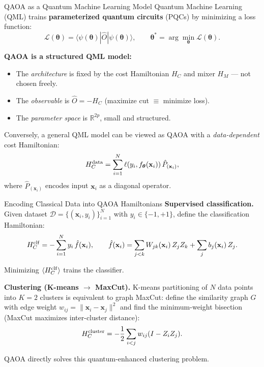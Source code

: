\documentclass{beamer}
\begin{document}
\begin{frame}{QAOA as a Quantum Machine Learning Model}
Quantum Machine Learning (QML) trains \textbf{parameterized quantum
circuits} (PQCs) by minimizing a loss function:
\[
\mathcal{L}(\boldsymbol{\theta})
= \langle\psi(\boldsymbol{\theta})|\hat{O}|\psi(\boldsymbol{\theta})\rangle,
\qquad
\boldsymbol{\theta}^* = \arg\min_{\boldsymbol{\theta}}\mathcal{L}(\boldsymbol{\theta}).
\]

\textbf{QAOA is a structured QML model:}
\begin{itemize}
\item The \emph{architecture} is fixed by the cost Hamiltonian $H_C$
  and mixer $H_M$ — not chosen freely.
\item The \emph{observable} is $\hat{O} = -H_C$ (maximize cut $\equiv$ minimize loss).
\item The \emph{parameter space} is $\mathbb{R}^{2p}$, small and structured.
\end{itemize}

\medskip

Conversely, a general QML model can be viewed as QAOA with a
\emph{data-dependent} cost Hamiltonian:
\[
H_C^{\rm data} = \sum_{i=1}^N \ell(y_i, f_{\boldsymbol{\theta}}(\mathbf{x}_i))\,
\hat{P}_{(\mathbf{x}_i)},
\]
where $\hat{P}_{(\mathbf{x}_i)}$ encodes input $\mathbf{x}_i$ as a
diagonal operator.
\end{frame}


\begin{frame}{Encoding Classical Data into QAOA Hamiltonians}
\textbf{Supervised classification.}  Given dataset
$\mathcal{D} = \{(\mathbf{x}_i, y_i)\}_{i=1}^N$ with
$y_i\in\{-1,+1\}$, define the classification Hamiltonian:
\[
H_C^{\rm clf}
= -\sum_{i=1}^N y_i\,\hat{f}(\mathbf{x}_i),
\qquad
\hat{f}(\mathbf{x}_i)
= \sum_{j<k} W_{jk}(\mathbf{x}_i)\,Z_jZ_k + \sum_j b_j(\mathbf{x}_i)\,Z_j.
\]

Minimizing $\langle H_C^{\rm clf}\rangle$ trains the classifier.

\medskip

\textbf{Clustering (K-means $\to$ MaxCut).}  K-means partitioning of
$N$ data points into $K=2$ clusters is equivalent to graph MaxCut:
define the similarity graph $G$ with edge weight
$w_{ij} = \|\mathbf{x}_i - \mathbf{x}_j\|^2$ and find the
minimum-weight bisection (MaxCut maximizes inter-cluster distance):
\[
H_C^{\rm cluster} = -\frac{1}{2}\sum_{i<j}w_{ij}(I - Z_iZ_j).
\]

QAOA directly solves this quantum-enhanced clustering problem.
\end{frame}
\end{document}
